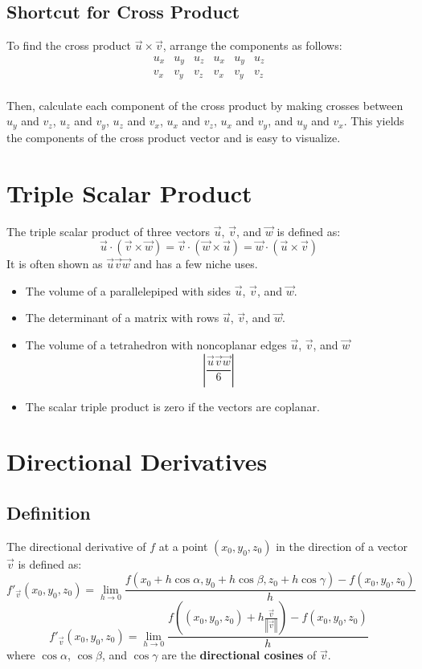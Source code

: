 \documentclass[a4paper,12pt,openany]{book}
\newcommand{\tsp}[3]{
    \vec{#1}\vec{#2}\vec{#3}
}
\newcommand{\abs}[1]{
    \left\vert#1\right\vert
}
\newcommand{\magn}[1]{
    \left\Vert#1\right\Vert
}
\begin{document}
\subsection{Shortcut for Cross Product}

To find the cross product \(\vec{u} \times \vec{v}\), arrange the components as follows:
\[
\begin{array}{|cccccc|}
    u_x & u_y & u_z & u_x & u_y & u_z \\
    v_x & v_y & v_z & v_x & v_y & v_z \\
\end{array}
\]

Then, calculate each component of the cross product by making crosses between $u_y$ and $v_z$, $u_z$ and $v_y$, $u_z$ and $v_x$, $u_x$ and $v_z$, $u_x$ and $v_y$, and $u_y$ and $v_x$. This yields the components of the cross product vector and is easy to visualize.

\section{Triple Scalar Product}
The triple scalar product of three vectors \(\vec{u}\), \(\vec{v}\), and \(\vec{w}\) is defined as:
\[
    \vec{u} \cdot (\vec{v} \times \vec{w}) = \vec{v} \cdot (\vec{w} \times \vec{u}) = \vec{w} \cdot (\vec{u} \times \vec{v})
\]
It is often shown as $\tsp{u}{v}{w}$ and has a few niche uses.
\begin{itemize}
    \item The volume of a parallelepiped with sides \(\vec{u}\), \(\vec{v}\), and \(\vec{w}\).
    \item The determinant of a matrix with rows \(\vec{u}\), \(\vec{v}\), and \(\vec{w}\).
    \item The volume of a tetrahedron with noncoplanar edges \(\vec{u}\), \(\vec{v}\), and \(\vec{w}\)
        \[
            \abs{\frac{\tsp{u}{v}{w}}{6}}
        \]
    \item The scalar triple product is zero if the vectors are coplanar. 
\end{itemize}
\section{Directional Derivatives}
\subsection{Definition}
The directional derivative of \(f\) at a point \((x_0, y_0, z_0)\) in the direction of a vector \(\vec{v}\) is defined as:
\[
    f'_{\vec{v}}(x_0, y_0, z_0) = 
    \lim_{h \to 0}
    \frac{
        f(x_0 + h \cos \alpha, y_0 + h \cos \beta, z_0 + h \cos \gamma) - f(x_0, y_0, z_0)
    }{h}
\]
\[
    f'_{\vec{v}}(x_0, y_0, z_0) = 
    \lim_{h \to 0}
    \frac{
        f((x_0, y_0, z_0) + h\frac{\vec{v}}{\magn{\vec{v}}}) - f(x_0, y_0, z_0)}{h}
\]
where \(\cos \alpha\), \(\cos \beta\), and \(\cos \gamma\) are the \textbf{directional cosines} of \(\vec{v}\).
\end{document}
